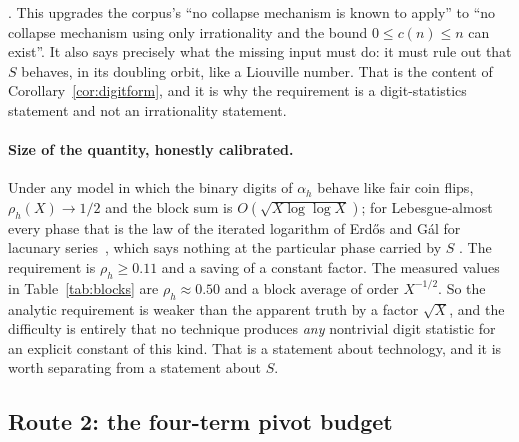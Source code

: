 \noindent
{} \quad {} \quad {}. This
upgrades the corpus's ``no collapse mechanism is known to apply'' to ``no
collapse mechanism using only irrationality and the bound $0\le c(n)\le n$ can
exist''. It also says precisely what the missing
input must do: it must rule out that $S$ behaves, in its doubling orbit,
like a Liouville number. That is the content of Corollary~\ref{cor:digitform},
and it is why the requirement is a digit-statistics statement and not an
irrationality statement.

\paragraph{Size of the quantity, honestly calibrated.}
Under any model in which the binary digits of $\alpha_h$ behave like fair
coin flips, $\rho_h(X)\to 1/2$ and the block sum is $O(\sqrt{X\log\log X})$;
for Lebesgue-almost every phase that is the law of the iterated logarithm of
Erd\H{o}s and G\'al for lacunary series~\cite[p.~65]{erdos-gal}, which says
nothing at the particular phase carried by $S$
. The requirement is $\rho_h\ge 0.11$ and a saving of a constant
factor. The measured values in Table~\ref{tab:blocks} are $\rho_h\approx 0.50$ and a block
average of order $X^{-1/2}$. So the analytic requirement is weaker than the
apparent truth by a factor $\sqrt X$, and the difficulty is entirely that no
technique produces \emph{any} nontrivial digit statistic for an explicit
constant of this kind. That is a statement about technology, and it is worth
separating from a statement about $S$.

\subsection{Route 2: the four-term pivot budget}\label{sub:pivot}


